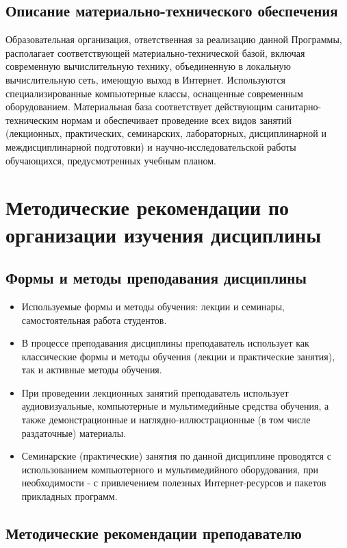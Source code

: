 \documentclass[a4paper, 12pt]{article}
\begin{document}
\subsection{Описание материально-технического обеспечения}

Образовательная организация, ответственная за реализацию данной Программы, располагает соответствующей материально-технической базой, включая современную вычислительную технику, объединенную в локальную вычислительную сеть, имеющую выход в Интернет. Используются специализированные компьютерные классы, оснащенные современным оборудованием. Материальная база соответствует действующим санитарно-техническим нормам и обеспечивает проведение всех видов занятий (лекционных, практических, семинарских, лабораторных, дисциплинарной и междисциплинарной подготовки) и научно-исследовательской работы обучающихся, предусмотренных учебным планом.

\section{Методические рекомендации по организации изучения дисциплины}

\subsection{Формы и методы преподавания дисциплины}

\begin{itemize}
    \item Используемые формы и методы обучения: лекции и семинары, самостоятельная работа студентов.
    \item В процессе преподавания дисциплины преподаватель использует как классические формы и методы обучения (лекции и практические занятия), так и активные методы обучения. 
    \item При проведении лекционных занятий преподаватель использует аудиовизуальные, компьютерные и мультимедийные средства обучения, а также демонстрационные и наглядно-иллюстрационные (в том числе раздаточные) материалы.
    \item Семинарские (практические) занятия по данной дисциплине проводятся с использованием компьютерного и мультимедийного оборудования, при необходимости - с привлечением полезных Интернет-ресурсов и пакетов прикладных программ. 
\end{itemize}

\subsection{Методические рекомендации преподавателю}
\end{document}
